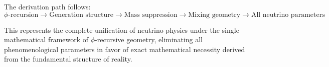 The derivation path follows:
$$\phi\text{-recursion} \to \text{Generation structure} \to \text{Mass suppression} \to \text{Mixing geometry} \to \text{All neutrino parameters}$$

This represents the complete unification of neutrino physics under the single mathematical framework of $\phi$-recursive geometry, eliminating all phenomenological parameters in favor of exact mathematical necessity derived from the fundamental structure of reality.
